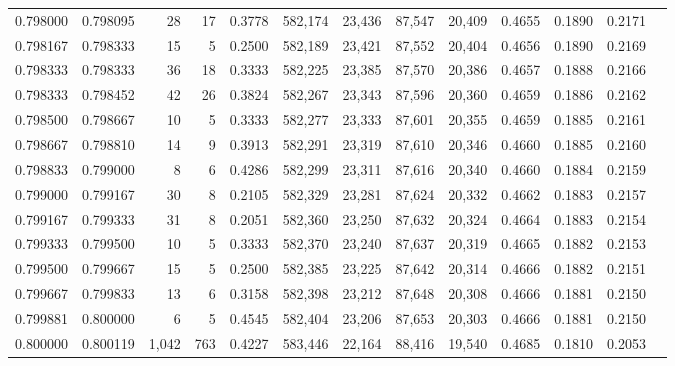 \begin{tabular}{rrrrrrrrrrrrr}
0.798000 & 0.798095 &    28 &  17 &                                     0.3778 & 582,174 &  23,436 &  87,547 &  20,409 & 0.4655 & 0.1890 & 0.2171 \\
0.798167 & 0.798333 &    15 &   5 &                                     0.2500 & 582,189 &  23,421 &  87,552 &  20,404 & 0.4656 & 0.1890 & 0.2169 \\
0.798333 & 0.798333 &    36 &  18 &                                     0.3333 & 582,225 &  23,385 &  87,570 &  20,386 & 0.4657 & 0.1888 & 0.2166 \\
0.798333 & 0.798452 &    42 &  26 &                                     0.3824 & 582,267 &  23,343 &  87,596 &  20,360 & 0.4659 & 0.1886 & 0.2162 \\
0.798500 & 0.798667 &    10 &   5 &                                     0.3333 & 582,277 &  23,333 &  87,601 &  20,355 & 0.4659 & 0.1885 & 0.2161 \\
0.798667 & 0.798810 &    14 &   9 &                                     0.3913 & 582,291 &  23,319 &  87,610 &  20,346 & 0.4660 & 0.1885 & 0.2160 \\
0.798833 & 0.799000 &     8 &   6 &                                     0.4286 & 582,299 &  23,311 &  87,616 &  20,340 & 0.4660 & 0.1884 & 0.2159 \\
0.799000 & 0.799167 &    30 &   8 &                                     0.2105 & 582,329 &  23,281 &  87,624 &  20,332 & 0.4662 & 0.1883 & 0.2157 \\
0.799167 & 0.799333 &    31 &   8 &                                     0.2051 & 582,360 &  23,250 &  87,632 &  20,324 & 0.4664 & 0.1883 & 0.2154 \\
0.799333 & 0.799500 &    10 &   5 &                                     0.3333 & 582,370 &  23,240 &  87,637 &  20,319 & 0.4665 & 0.1882 & 0.2153 \\
0.799500 & 0.799667 &    15 &   5 &                                     0.2500 & 582,385 &  23,225 &  87,642 &  20,314 & 0.4666 & 0.1882 & 0.2151 \\
0.799667 & 0.799833 &    13 &   6 &                                     0.3158 & 582,398 &  23,212 &  87,648 &  20,308 & 0.4666 & 0.1881 & 0.2150 \\
0.799881 & 0.800000 &     6 &   5 &                                     0.4545 & 582,404 &  23,206 &  87,653 &  20,303 & 0.4666 & 0.1881 & 0.2150 \\
0.800000 & 0.800119 & 1,042 & 763 &                                     0.4227 & 583,446 &  22,164 &  88,416 &  19,540 & 0.4685 & 0.1810 & 0.2053 \\

\end{tabular}
